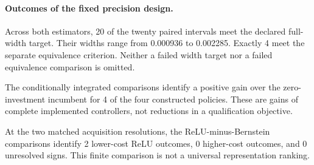 \paragraph{Outcomes of the fixed precision design.}

Across both estimators, 20 of the twenty paired intervals meet the declared full-width target. Their widths range from 0.000936 to 0.002285. Exactly 4 meet the separate equivalence criterion. Neither a failed width target nor a failed equivalence comparison is omitted.

The conditionally integrated comparisons identify a positive gain over the zero-investment incumbent for 4 of the four constructed policies. These are gains of complete implemented controllers, not reductions in a qualification objective.

At the two matched acquisition resolutions, the ReLU-minus-Bernstein comparisons identify 2 lower-cost ReLU outcomes, 0 higher-cost outcomes, and 0 unresolved signs. This finite comparison is not a universal representation ranking.
